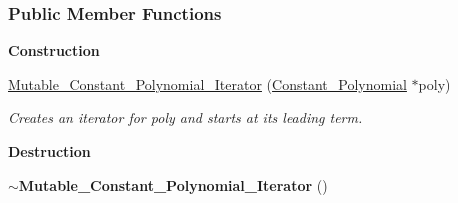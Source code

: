 \subsubsection*{Public Member Functions}
\begin{Indent}\textbf{ Construction}\par
\begin{DoxyCompactItemize}
\item 
\hyperlink{group___iterator_group_ac443c5f24675fc7c8fb69bbd167b634b}{Mutable\+\_\+\+Constant\+\_\+\+Polynomial\+\_\+\+Iterator} (\hyperlink{group__polygroup_class_constant___polynomial}{Constant\+\_\+\+Polynomial} $\ast$poly)
\begin{DoxyCompactList}\small\item\em Creates an iterator for {\ttfamily poly} and starts at its leading term. \end{DoxyCompactList}\end{DoxyCompactItemize}
\end{Indent}
\begin{Indent}\textbf{ Destruction}\par
\begin{DoxyCompactItemize}
\item 
\mbox{\label{group___iterator_group_a7a4ed35d8a8429bfaf395b034643941b}} 
{\bfseries $\sim$\+Mutable\+\_\+\+Constant\+\_\+\+Polynomial\+\_\+\+Iterator} ()
\end{DoxyCompactItemize}
\end{Indent}
